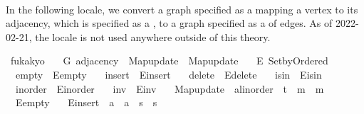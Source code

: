 \begin{isabellebody}
\ \ \isamarkupfalse%
\isanewline
{}\isamarkupfalse%
%
\endisatagproof
{\isafoldproof}%
%
\isadelimproof
\isanewline
%
\endisadelimproof
{}\isamarkupfalse%
%
\isadeliminvisible
%
\endisadeliminvisible
%
\isataginvisible
%
\begin{isamarkuptext}%
In the following locale, we convert a graph specified as a  mapping a vertex
to its adjacency, which is specified as a , to a graph specified as a
 of edges. As of 2022-02-21, the locale is not used anywhere outside of this
theory.%
\end{isamarkuptext}\isamarkuptrue%
\isamarkupfalse%
\ fukakyo\ {\isacharequal}{\kern0pt}\isanewline
\ \ G{\isacharcolon}{\kern0pt}\ adjacency\ \ Map{\isacharunderscore}{\kern0pt}update\ {\isacharequal}{\kern0pt}\ Map{\isacharunderscore}{\kern0pt}update\ {\isacharplus}{\kern0pt}\isanewline
\ \ E{\isacharcolon}{\kern0pt}\ Set{\isacharunderscore}{\kern0pt}by{\isacharunderscore}{\kern0pt}Ordered\ \isanewline
\ \ empty\ {\isacharequal}{\kern0pt}\ E{\isacharunderscore}{\kern0pt}empty\ \isanewline
\ \ insert\ {\isacharequal}{\kern0pt}\ E{\isacharunderscore}{\kern0pt}insert\ \isanewline
\ \ delete\ {\isacharequal}{\kern0pt}\ E{\isacharunderscore}{\kern0pt}delete\ \isanewline
\ \ isin\ {\isacharequal}{\kern0pt}\ E{\isacharunderscore}{\kern0pt}isin\ \isanewline
\ \ inorder\ {\isacharequal}{\kern0pt}\ E{\isacharunderscore}{\kern0pt}inorder\ \isanewline
\ \ inv\ {\isacharequal}{\kern0pt}\ E{\isacharunderscore}{\kern0pt}inv\ \isanewline
\ \ Map{\isacharunderscore}{\kern0pt}update\ {\isacharcolon}{\kern0pt}{\isacharcolon}{\kern0pt}\ {\isachardoublequoteopen}{\isacharprime}{\kern0pt}a{\isacharcolon}{\kern0pt}{\isacharcolon}{\kern0pt}linorder\ {\isasymRightarrow}\ {\isacharprime}{\kern0pt}t\ {\isasymRightarrow}\ {\isacharprime}{\kern0pt}m\ {\isasymRightarrow}\ {\isacharprime}{\kern0pt}m{\isachardoublequoteclose}\ \isanewline
\ \ E{\isacharunderscore}{\kern0pt}empty\ \isanewline
\ \ E{\isacharunderscore}{\kern0pt}insert\ {\isacharcolon}{\kern0pt}{\isacharcolon}{\kern0pt}\ {\isachardoublequoteopen}{\isacharprime}{\kern0pt}a\ {\isasymtimes}\ {\isacharprime}{\kern0pt}a\ {\isasymRightarrow}\ {\isacharprime}{\kern0pt}s\ {\isasymRightarrow}\ {\isacharprime}{\kern0pt}s{\isachardoublequoteclose}\ \isanewline

\end{isabellebody}

